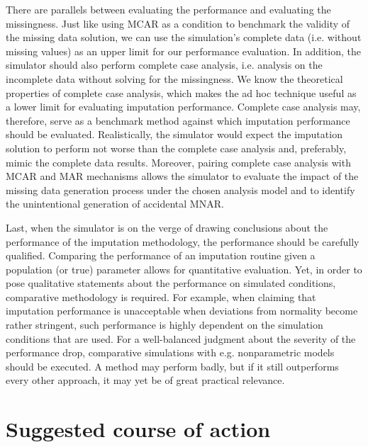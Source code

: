 \documentclass[bimj,fleqn]{w-art}
\begin{document}
There are parallels between evaluating the performance and evaluating the missingness. Just like using MCAR as a condition to benchmark the validity of the missing data solution, we can use the simulation's complete data (i.e. without missing values) as an upper limit for our performance evaluation. In addition, the simulator should also perform complete case analysis, i.e. analysis on the incomplete data without solving for the missingness. We know the theoretical properties of complete case analysis, which makes the ad hoc technique useful as a lower limit for evaluating imputation performance. Complete case analysis may, therefore, serve as a benchmark method against which imputation performance should be evaluated. Realistically, the simulator would expect the imputation solution to perform not worse than the complete case analysis and, preferably, mimic the complete data results. Moreover, pairing complete case analysis with MCAR and MAR mechanisms allows the simulator to evaluate the impact of the missing data generation process under the chosen analysis model and to identify the unintentional generation of accidental MNAR. 



Last, when the simulator is on the verge of drawing conclusions about the performance of the imputation methodology, the performance should be carefully qualified. Comparing the performance of an imputation routine given a population (or true) parameter allows for quantitative evaluation. Yet, in order to pose qualitative statements about the performance on simulated conditions, comparative methodology is required. For example, when claiming that imputation performance is unacceptable when deviations from normality become rather stringent, such performance is highly dependent on the simulation conditions that are used. For a well-balanced judgment about the severity of the performance drop, comparative simulations with e.g. nonparametric models should be executed. A method may perform badly, but if it still outperforms every other approach, it may yet be of great practical relevance.



\section{Suggested course of action}
\end{document}
